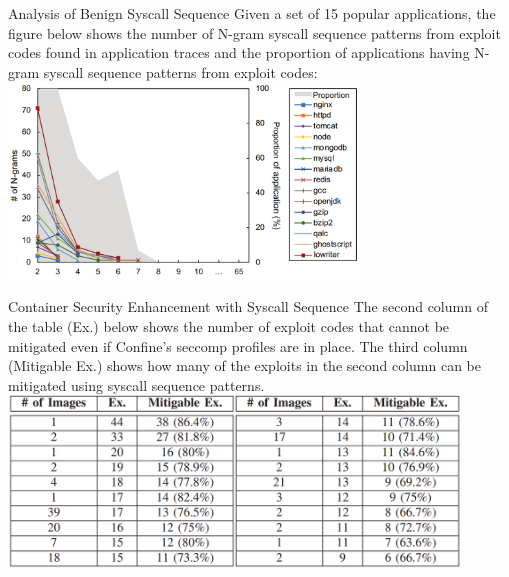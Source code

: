\documentclass{beamer}
\begin{document}
\begin{frame}{Analysis of Benign Syscall Sequence}
Given a set of 15 popular applications, the figure below shows the number of N-gram syscall sequence patterns from exploit codes found in application traces and the proportion of applications having N-gram syscall sequence patterns from exploit codes:
\hspace*{2cm}
\includegraphics[width=0.7\textwidth]
{assets/NIMOS/NIMOS-benign.PNG}
\end{frame}

\begin{frame}{Container Security Enhancement with Syscall Sequence}
The second column of the table (Ex.) below shows the number of exploit codes that cannot be mitigated even if Confine's seccomp profiles are in place. The third column (Mitigable Ex.) shows how many of the exploits in the second column can be mitigated using syscall sequence patterns. %
\hspace*{0.6cm}
\includegraphics[width=0.9\textwidth]
{assets/NIMOS/NIMOS-vs-Confine.PNG}
\end{frame}
\end{document}
